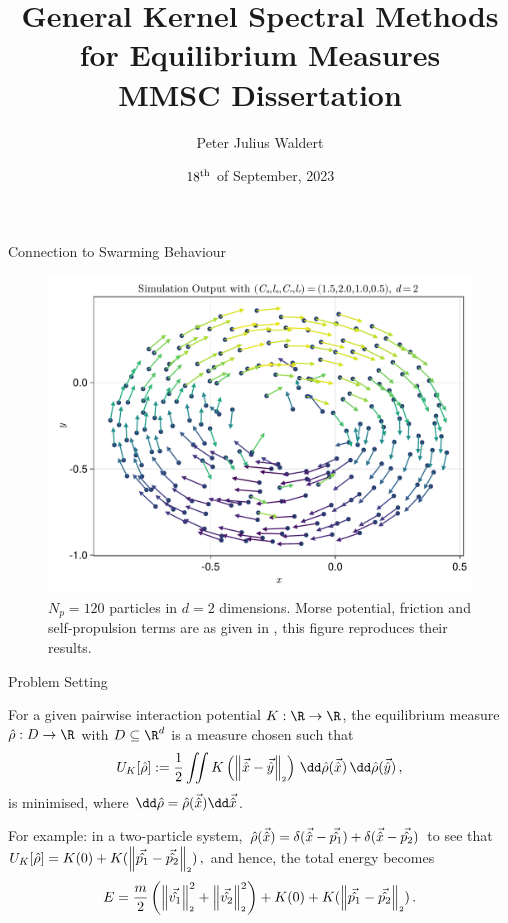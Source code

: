 \documentclass[aspectratio=169, hyperref={colorlinks=true}]{beamer}
\title{General Kernel Spectral Methods for Equilibrium Measures \\ \normalsize MMSC Dissertation}
\author{Peter Julius Waldert}
\institute{Mathematical Institute \\ University of Oxford}
\date{$18^{\rm th}$ of September, 2023}
\begin{document}
  {\frame{\titlepage}}

  \begin{frame}{Connection to Swarming Behaviour}
    \begin{figure}[H]
      \centering
      \includegraphics[width=0.56\linewidth]{results/morse-2d/simulation-quiver.pdf}
      \caption[Quiver plot of 120 particles in 2D interacting through the Morse potential]{$N_p = 120$ particles in $d = 2$ dimensions. Morse potential, friction and self-propulsion terms are as given in \cite{2006-self-propelled}, this figure reproduces their results.}
      \label{fig:simulation-quiver-illustration}
    \end{figure}
  \end{frame}

  \begin{frame}{Problem Setting}
    \begin{definition}
      For a given pairwise interaction potential $K: \R \to \R$, the equilibrium measure $\hat{\rho}: D \to \R$ with $D \subseteq \R^d$ is a measure chosen such that
      $$U_K[\hat{\rho}] := \frac{1}{2} \iint K\left(\norm{\hatvec{x} - \hatvec{y}}\right) \,\dd\hat{\rho}(\hatvec{x})\,\dd\hat{\rho}(\hatvec{y})\,,$$
      is minimised, where $\dd\hat{\rho} = \hat{\rho}(\hatvec{x})\dd\hatvec{x}$.
    \end{definition}
    \pause

    For example: in a two-particle system, $\hat{\rho}(\vec{\hat{x}}) = \delta(\vec{\hat{x}}-\vec{\hat{p_1}}) + \delta(\vec{\hat{x}}-\vec{\hat{p_2}})$ to see that
    $U_K[\hat{\rho}] = K(0) + K(\left\lVert\vec{\hat{p_1}} - \vec{\hat{p_2}}\right\rVert_{\scriptscriptstyle 2})\,,$
    and hence, the total energy becomes
    $$E = \frac{m}{2} \left(\left\lVert\vec{\hat{v_1}}\right\rVert_{\scriptscriptstyle 2}^2 + \left\lVert\vec{\hat{v_2}}\right\rVert_{\scriptscriptstyle 2}^2\right) + K(0) + K(\left\lVert\vec{\hat{p_1}} - \vec{\hat{p_2}}\right\rVert_{\scriptscriptstyle 2})\,.$$
  \end{frame}
\end{document}
